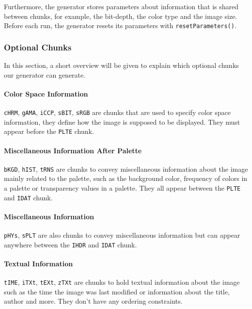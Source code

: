 \documentclass[runningheads]{llncs}
\begin{document}
Furthermore, the generator stores parameters about information that is shared between chunks, for example, the bit-depth, the color type and the image size. 
Before each run, the generator resets its parameters with \texttt{resetParameters()}.
\subsubsection{Optional Chunks}
In this section, a short overview will be given to explain which optional chunks~\cite{libpng_chunks} our generator can generate.

\paragraph{Color Space Information}
\texttt{cHRM}, \texttt{gAMA}, \texttt{iCCP}, \texttt{sBIT}, \texttt{sRGB} are chunks that are used to specify color space information, they define how the image is supposed to be displayed. They must appear before the \texttt{PLTE} chunk.

\paragraph{Miscellaneous Information After Palette}
\texttt{bKGD}, \texttt{hIST}, \texttt{tRNS} are chunks to convey miscellaneous information about the image mainly related to the palette, such as the background color, frequency of colors in a palette or transparency values in a palette. They all appear between the \texttt{PLTE} and \texttt{IDAT} chunk.

\paragraph{Miscellaneous Information}
\texttt{pHYs}, \texttt{sPLT} are also chunks to convey miscellaneous information but can appear anywhere between the \texttt{IHDR} and \texttt{IDAT} chunk.

\paragraph{Textual Information}
\texttt{tIME}, \texttt{iTXt}, \texttt{tEXt}, \texttt{zTXt} are chunks to hold textual information about the image such as the time the image was last modified or information about the title, author and more. They don't have any ordering constraints.
\end{document}
